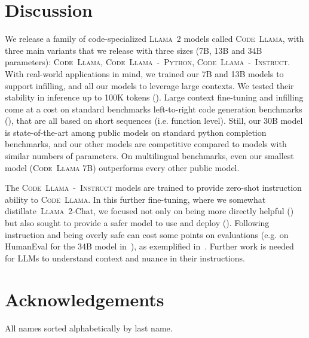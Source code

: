 \documentclass[10pt]{article}
\newcommand{\model}{\textsc{Code~Llama}\xspace}
\newcommand{\instmodel}{\textsc{Code~Llama~-~Instruct}\xspace}
\newcommand{\pymodel}{\textsc{Code~Llama~-~Python}\xspace}
\newcommand{\llamavtwo}{\textsc{Llama~2}\xspace}
\begin{document}
\section{Discussion}
We release a family of code-specialized \llamavtwo models called \model, with three main variants that we release with three sizes (7B, 13B and 34B parameters): \model, \pymodel, \instmodel. 
With real-world applications in mind, we trained our 7B and 13B models to support infilling, and all our models to leverage large contexts. We tested their stability in inference up to 100K tokens (). 
Large context fine-tuning and infilling come at a cost on standard benchmarks left-to-right code generation benchmarks (), that are all based on short sequences (i.e. function level). 
Still, our 30B model is state-of-the-art among public models on standard python completion benchmarks, and our other models are competitive compared to models with similar numbers of parameters. 
On multilingual benchmarks, even our smallest model (\model 7B) outperforms every other public model. 

The \instmodel models are trained to provide zero-shot instruction ability to \model. In this further fine-tuning, where we somewhat distillate~\llamavtwo-Chat, we focused not only on being more directly helpful () but also sought to provide a safer model to use and deploy (). Following instruction and being overly safe can cost some points on evaluations (e.g. on HumanEval for the 34B model in~), as exemplified in~. Further work is needed for LLMs to understand context and nuance in their instructions.





\appendix

\section{Acknowledgements}
All names sorted alphabetically by last name.
\end{document}
